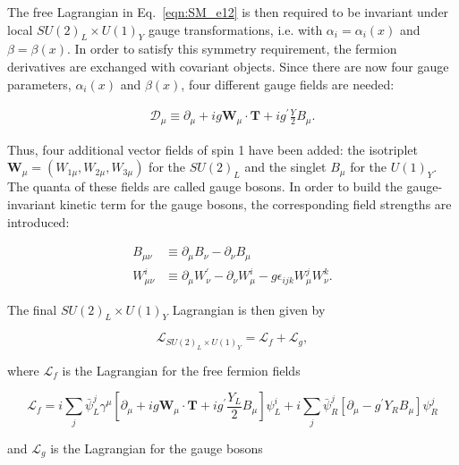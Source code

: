 The free Lagrangian in Eq.~\ref{eqn:SM_e12} is then required to be invariant under local $SU(2)_L\times U(1)_Y$ gauge transformations,
i.e. with $\alpha_i = \alpha_i(x)$ and $\beta = \beta(x)$.
In order to satisfy this symmetry requirement, the fermion derivatives are exchanged with covariant objects.
Since there are now four gauge parameters, $\alpha_i(x)$ and $\beta(x)$, four different gauge fields are needed:

\begin{eqnarray}\label{eqn:SM_e16}
\mathcal{D}_\mu \equiv \partial_\mu + ig\textbf{W}_\mu \cdot \textbf{T} + ig^\prime\frac{Y}{2}B_\mu.
\end{eqnarray}

Thus, four additional vector fields of spin 1 have been added: the isotriplet $\textbf{W}_\mu = (W_{1\mu}, W_{2\mu}, W_{3\mu})$ for the $SU(2)_L$ and the singlet $B_\mu$ for the $U(1)_Y$.
The quanta of these fields are called gauge bosons.
In order to build the gauge-invariant kinetic term for the gauge bosons, the corresponding field strengths are introduced: 

\begin{equation}\label{eqn:SM_e17}
\begin{split}
B_{\mu\nu} & \equiv \partial_\mu B_\nu - \partial_\nu B_\mu\\
W^i_{\mu\nu} & \equiv \partial_\mu W^\prime_\nu - \partial_\nu W^i_\mu - g\epsilon_{ijk} W^j_\mu W^k_\nu.
\end{split}
\end{equation}

The final $SU(2)_L \times U(1)_Y$ Lagrangian is then given by

\begin{equation}\label{eqn:SM_e18}
\mathcal{L}_{SU(2)_L\times U(1)_Y} = \mathcal{L}_f + \mathcal{L}_g,
\end{equation}

\noindent where $\mathcal{L}_f$ is the Lagrangian for the free fermion fields

\begin{equation}\label{eqn:SM_e19}
\mathcal{L}_f = i\sum_{j}\bar{\psi}^j_L\gamma^\mu[\partial_\mu + ig\textbf{W}_\mu \cdot \textbf{T} + ig^\prime\frac{Y_L}{2}B_\mu]\psi^i_L + i\sum_j\bar{\psi}^j_R[\partial_\mu - g^\prime Y_RB_\mu]\psi^j_R
\end{equation}

\noindent and $\mathcal{L}_g$ is the Lagrangian for the gauge bosons

